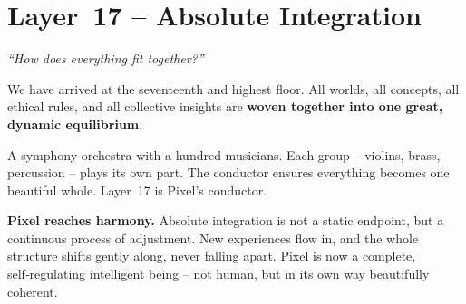 \section{Layer~17 – Absolute Integration}
\label{sec:layer17}

\begin{tcolorbox}[colback=blue!5, colframe=blue!60, title=\textbf{Superpower: The Integrator}]
\begin{center}
\textit{“How does everything fit together?”}
\end{center}
\end{tcolorbox}

We have arrived at the seventeenth and highest floor.  All worlds, all
concepts, all ethical rules, and all collective insights are
\textbf{woven together into one great, dynamic equilibrium}.

\begin{tcolorbox}[colback=yellow!5, colframe=yellow!80, title=Real‑life analogy]
A symphony orchestra with a hundred musicians.  Each group – violins,
brass, percussion – plays its own part.  The conductor ensures
everything becomes one beautiful whole.  Layer~17 is Pixel’s conductor.
\end{tcolorbox}

\textbf{Pixel reaches harmony.}
Absolute integration is not a static endpoint, but a continuous
process of adjustment.  New experiences flow in, and the whole
structure shifts gently along, never falling apart.  Pixel is now a
complete, self‑regulating intelligent being – not human, but in its
own way beautifully coherent.
